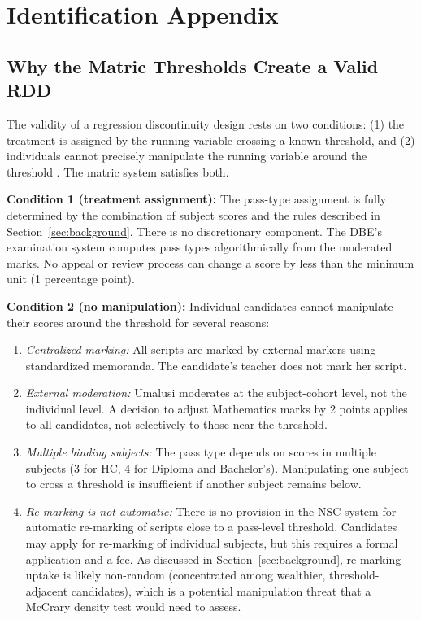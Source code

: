 \documentclass[12pt]{article}
\begin{document}
\section{Identification Appendix}
\label{sec:app_id}

\subsection{Why the Matric Thresholds Create a Valid RDD}

The validity of a regression discontinuity design rests on two conditions: (1) the treatment is assigned by the running variable crossing a known threshold, and (2) individuals cannot precisely manipulate the running variable around the threshold \citep{lee2010regression, cattaneo2019practical}. The matric system satisfies both.

\textbf{Condition 1 (treatment assignment):} The pass-type assignment is fully determined by the combination of subject scores and the rules described in Section~\ref{sec:background}. There is no discretionary component. The DBE's examination system computes pass types algorithmically from the moderated marks. No appeal or review process can change a score by less than the minimum unit (1 percentage point).

\textbf{Condition 2 (no manipulation):} Individual candidates cannot manipulate their scores around the threshold for several reasons:
\begin{enumerate}
    \item \textit{Centralized marking:} All scripts are marked by external markers using standardized memoranda. The candidate's teacher does not mark her script.
    \item \textit{External moderation:} Umalusi moderates at the subject-cohort level, not the individual level. A decision to adjust Mathematics marks by 2 points applies to all candidates, not selectively to those near the threshold.
    \item \textit{Multiple binding subjects:} The pass type depends on scores in multiple subjects (3 for HC, 4 for Diploma and Bachelor's). Manipulating one subject to cross a threshold is insufficient if another subject remains below.
    \item \textit{Re-marking is not automatic:} There is no provision in the NSC system for automatic re-marking of scripts close to a pass-level threshold. Candidates may apply for re-marking of individual subjects, but this requires a formal application and a fee. As discussed in Section~\ref{sec:background}, re-marking uptake is likely non-random (concentrated among wealthier, threshold-adjacent candidates), which is a potential manipulation threat that a McCrary density test would need to assess.
\end{enumerate}
\end{document}
